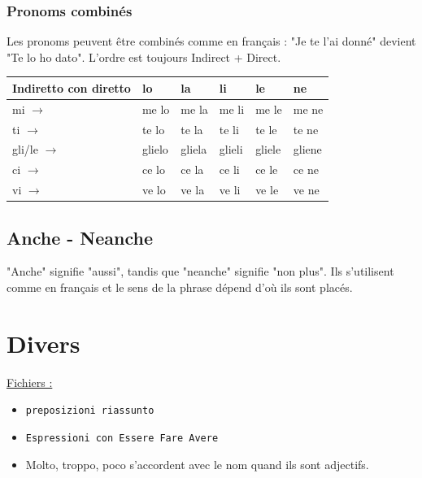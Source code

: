 \documentclass[12pt, openany]{report}
\begin{document}
\subsection{Pronoms combinés}
Les pronoms peuvent être combinés comme en français : "Je te l'ai donné" devient "Te lo ho dato". L'ordre est toujours Indirect + Direct. 
\begin{center}
\setlength{\tabcolsep}{10pt} 
\renewcommand{\arraystretch}{1.3} 
\begin{tabular}{p{2.5cm}|p{1.8cm}|p{1.8cm}|p{1.8cm}|p{1.8cm}|p{1.8cm}}
    \textbf{Indiretto con diretto} & lo & la & li & le & ne \\ \hline 
    mi $\rightarrow$ & me lo & me la & me li & me le & me ne\\ 
    ti $\rightarrow$ & te lo & te la & te li & te le & te ne\\
    gli/le $\rightarrow$ & glielo & gliela & glieli & gliele & gliene\\
    ci $\rightarrow$ & ce lo & ce la & ce li & ce le & ce ne\\
    vi $\rightarrow$ & ve lo & ve la & ve li & ve le & ve ne\\
\end{tabular}
\end{center}
\section{Anche - Neanche}
"Anche" signifie "aussi", tandis que "neanche" signifie "non plus". Ils s'utilisent comme en français et le sens de la phrase dépend d'où ils sont placés. 
\chapter{Divers}
\underline{Fichiers :}
\begin{itemize}
    \item \texttt{preposizioni riassunto}
    \item \texttt{Espressioni con Essere Fare Avere}
    \item Molto, troppo, poco s'accordent avec le nom quand ils sont adjectifs. 
\end{itemize}
\end{document}
